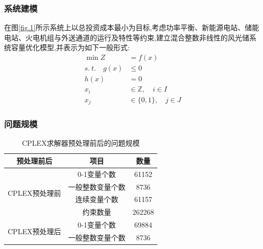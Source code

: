 \documentclass{beamer}
\begin{document}
\begin{frame}
	\frametitle{系统建模} 
	\qquad 在图\ref*{fig.1}所示系统上以总投资成本最小为目标,考虑功率平衡、新能源电站、储能电站、火电机组与外送通道的运行及特性等约束,建立混合整数非线性的风光储系统容量优化模型,并表示为如下一般形式:
	\begin{align}
		\min Z&=f(x)\label{eq.1}\\
		s.\ t. \quad g(x) &\leq 0 \label{eq.2}\\
		h(x)&=0 \label{eq.3}\\
		x_i &\in \mathbb{Z},\quad  i \in I \label{eq.4}\\
		x_j &\in \{0,1\}, \quad j \in J \label{eq.5}
	\end{align}
\end{frame}

\begin{frame}
	\frametitle{问题规模}
	\begin{table}[htbp]
		\centering
		\caption{CPLEX求解器预处理前后的问题规模}
		\label{tab.1}
		\begin{tabular}{|c|c|c|}
		\hline
		预处理前后 & 项目 & 数量  \\ \hline
		\multirow{4}{*}{CPLEX预处理前}	& 0-1变量个数  		& 61152  \\ \cline{2-3} 
										& 一般整数变量个数 	& 8736   \\ \cline{2-3} 
								   		& 连续变量个数   	& 61157  \\ \cline{2-3} 
								   		& 约束数量			& 262268 \\ \hline
		\multirow{2}{*}{CPLEX预处理后} 	& 0-1变量个数		& 69884  \\ \cline{2-3} 
								   		& 一般整数变量个数 	& 8736   \\ \hline
		\end{tabular}
	\end{table}
\end{frame}
\end{document}
